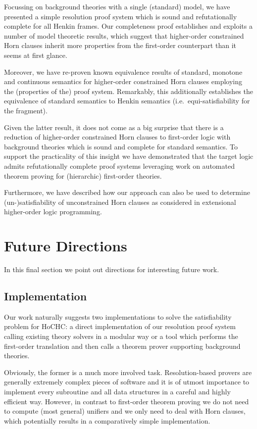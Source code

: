 \documentclass[a4paper,twoside,notitlepage,openright,11pt]{report}
\begin{document}
Focussing on background theories with a single (standard) model, we have presented a simple resolution proof system which is sound and refutationally complete for all Henkin frames. Our completeness proof establishes and exploits a number of model theoretic results, which suggest that higher-order constrained Horn clauses inherit more properties from the first-order counterpart than it seems at first glance.

Moreover, we have re-proven known equivalence results of standard, monotone and continuous semantics for higher-order constrained Horn clauses employing the (properties of the) proof system. Remarkably, this additionally establishes the equivalence of standard semantics to Henkin semantics (i.e.\ equi-satisfiability for the fragment).

Given the latter result, it does not come as a big surprise that there is a reduction of higher-order constrained Horn clauses to first-order logic with background theories which is sound and complete for standard semantics. To support the practicality of this insight we have demonstrated that the target logic admits refutationally complete proof systems leveraging work on automated theorem proving for (hierarchic) first-order theories.

Furthermore, we have described how our approach can also be used to determine (un-)satisfiability of unconstrained Horn clauses as considered in extensional higher-order logic programming.


\section{Future Directions}
In this final section we point out directions for interesting future work.
\subsection{Implementation} Our work naturally suggests two implementations to solve the satisfiability problem for HoCHC: a direct implementation of our resolution proof system calling existing theory solvers in a modular way or a tool which performs the first-order translation and then calls a theorem prover supporting background theories.

Obviously, the former is a much more involved task. Resolution-based provers are generally extremely complex pieces of software \cite{WDFKSW09,RV01} and it is of utmost importance to implement every subroutine and all data structures in a careful and highly efficient way. 
However, in contrast to first-order theorem proving we do not need to compute (most general) unifiers and we only need to deal with Horn clauses, which potentially results in a comparatively simple implementation.
\end{document}
